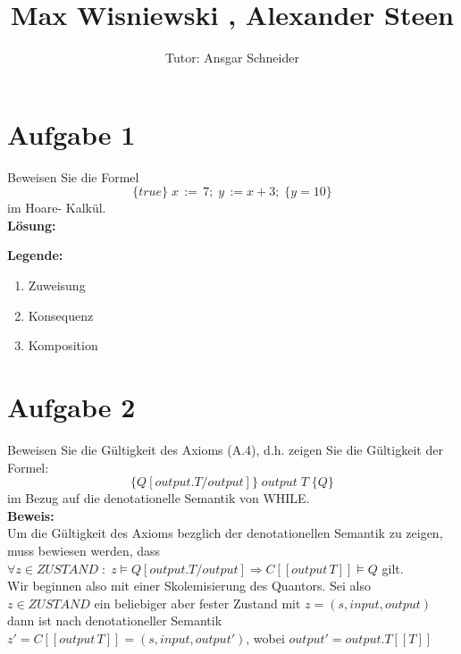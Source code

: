 \documentclass[11pt,a4paper,ngerman]{article}
\author{Tutor: Ansgar Schneider}
\date{}
\title{Max Wisniewski , Alexander Steen}
\begin{document}

\maketitle
\thispagestyle{fancy}



\section*{Aufgabe 1}
Beweisen Sie die Formel
$$
    \{true\} \; x \, := \,7; \; y \, := x + 3; \;\{y=10\}
$$
im Hoare- Kalkül.\\
\textbf{Lösung:}\\
\begin{prooftree}
\end{prooftree}

\textbf{Legende:}
\begin{enumerate}[(1)]
    \item Zuweisung
    \item Konsequenz
    \item Komposition
\end{enumerate}
\section*{Aufgabe 2}
Beweisen Sie die Gültigkeit des Axioms (A.4), d.h. zeigen Sie die Gültigkeit
der Formel:
$$
    \{Q[output.T/output]\} \; output \; T \; \{Q\}
$$
im Bezug auf die denotationelle Semantik von WHILE.\\

\textbf{Beweis:}\\
Um die Gültigkeit des Axioms bezglich der denotationellen Semantik zu zeigen, muss
bewiesen werden, dass
$\forall z \in ZUSTAND \; : \; z \models Q[output.T/output] \Rightarrow C[\![output \, T ]\!] \models Q$
gilt.\\
Wir beginnen also mit einer Skolemisierung des Quantors. Sei also $z\in ZUSTAND$ ein beliebiger
aber fester Zustand mit $z=(s,input,output)$ dann ist nach denotationeller Semantik 
$z' = C[\![ output \, T ]\!] = (s,input,output')$, wobei $output' = output.T[\![T]\!]$\\
\end{document}

